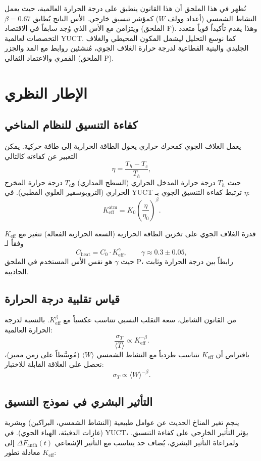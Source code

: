\documentclass[11pt,a4paper]{article}
\newcommand{\Keff}{K_{\mathrm{eff}}}
\newcommand{\be}{\beta}
\newcommand{\ga}{\gamma}
\begin{document}
	نُظهر في هذا الملحق أن هذا القانون ينطبق على درجة الحرارة العالمية، حيث يعمل النشاط الشمسي (أعداد وولف \(W\)) كمؤشر تنسيق خارجي. الأس الناتج يُطابق \(\be = 0.67\) ويتزامن مع الأس الذي وُجد سابقاً في الاقتصاد (الملحق F). وهذا يقدم تأكيداً قوياً متعدد التخصصات لعالمية YUCT. كما نوسع التحليل ليشمل المكون المحيطي والغلاف الجليدي والبنية القطاعية لدرجة حرارة الغلاف الجوي، مُنشئين روابط مع المد والجزر القمري والاعتماد الثقالي (الملحق P).
	
	\section{الإطار النظري}
	
	\subsection{كفاءة التنسيق للنظام المناخي}
	
	يعمل الغلاف الجوي كمحرك حراري يحول الطاقة الحرارية إلى طاقة حركية. يمكن التعبير عن كفاءته كالتالي
	\[
	\eta = \frac{T_h - T_c}{T_h},
	\]
	حيث \(T_h\) درجة حرارة المدخل الحراري (السطح المداري) و\(T_c\) درجة حرارة المخرج الحراري (التروبوسفير العلوي القطبي). في YUCT ترتبط كفاءة التنسيق الجوي بـ \(\eta\):
	\[
	\Keff^{\text{atm}} = K_0 \left( \frac{\eta}{\eta_0} \right)^{\be}.
	\]
	
	قدرة الغلاف الجوي على تخزين الطاقة الحرارية (السعة الحرارية الفعالة) تتغير مع \(\Keff\) وفقاً لـ
	\[
	C_{\text{heat}} = C_0 \cdot \Keff^{\ga}, \qquad \ga \approx 0.3 \pm 0.05,
	\]
	حيث \(\ga\) هو نفس الأس المستخدم في الملحق P، رابطاً بين درجة الحرارة وثابت الجاذبية.
	
	\subsection{قياس تقلبية درجة الحرارة}
	
	من القانون الشامل، سعة التقلب النسبي تتناسب عكسياً مع \(\Keff^{\be}\). بالنسبة لدرجة الحرارة العالمية:
	\[
	\frac{\sigma_T}{\langle T \rangle} \propto \Keff^{-\be}.
	\]
	بافتراض أن \(\Keff\) تتناسب طردياً مع النشاط الشمسي \(\langle W \rangle\) (مُوسَّطاً على زمن مميز)، نحصل على العلاقة القابلة للاختبار:
	\[
	\sigma_T \propto \langle W \rangle^{-\be}.
	\]
	
	\subsection{التأثير البشري في نموذج التنسيق}
	
	ينجم تغير المناخ الحديث عن عوامل طبيعية (النشاط الشمسي، البراكين) وبشرية (غازات الدفيئة، الهباء الجوي). في YUCT، يؤثر التأثير الخارجي على كفاءة التنسيق. ولمراعاة التأثير البشري، يُضاف حد يتناسب مع التأثير الإشعاعي \(\Delta F_{\mathrm{anth}}(t)\) إلى معادلة تطور \(K_{\mathrm{eff}}\):
	
\end{document}
